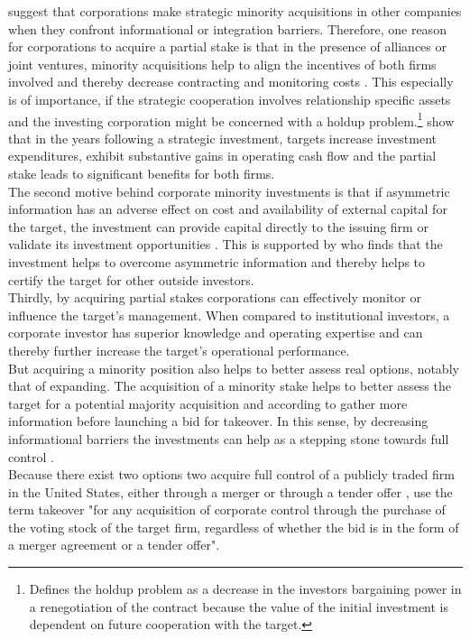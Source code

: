 \documentclass[12pt]{article}
\begin{document}
\citet[p.1]{Huang2017} suggest that corporations make strategic minority acquisitions in other companies when they confront informational or integration barriers. 
Therefore, one reason for corporations to acquire a partial stake is that in the presence of alliances or joint ventures, minority acquisitions help to align the incentives of both firms involved and thereby decrease contracting and monitoring costs \citep[p.2792]{Allen2000}. This especially is of importance, if the strategic cooperation involves relationship specific assets and the investing corporation might be concerned with a holdup problem.\footnote{\citet[p.1023]{Ouimet2013} Defines the holdup problem as a decrease in the investors bargaining power in a renegotiation of the contract because the value of the initial investment is dependent on future cooperation with the target.} \citet[p. 2793]{Allen2000} show that in the years following a strategic investment,  targets increase investment expenditures, exhibit substantive gains in operating cash flow and the partial stake leads to significant benefits for both firms.\\
The second motive behind corporate minority investments is that if asymmetric information has an adverse effect on cost and availability of external capital for the target, the investment can provide capital directly to the issuing firm or validate its investment opportunities \citep[p. 2792]{Allen2000}. This is supported by \citet[P.1038]{Ouimet2013} who finds that the investment helps to overcome asymmetric information and thereby helps to certify the target for other outside investors.\\
Thirdly, by acquiring partial stakes corporations can effectively monitor or influence the target's management. When compared to institutional investors, a corporate investor has superior knowledge and operating expertise \citep[p.2792]{Allen2000} and can thereby further increase the target's operational performance.\\
But acquiring a minority position also helps to better assess real options, notably that of expanding. The acquisition of a minority stake helps to better assess the target for a potential majority acquisition \citep{Ouimet2013} and according to \citet[p.30]{Huang2017} gather more information before launching a bid for takeover. In this sense, by decreasing informational barriers the investments can help as a stepping stone towards full control \citep[p.3]{Huang2017}.\\
Because there exist two options two acquire full control of a publicly traded firm in the United States, either through a merger or through a tender offer \citep[p.2]{Offenberg2015}, \citet[p.1]{Betton2008} use the term takeover "for any acquisition of corporate control through the purchase of the voting stock of the target firm, regardless of whether the bid is in the form of a merger agreement or a tender offer".\\
\end{document}

